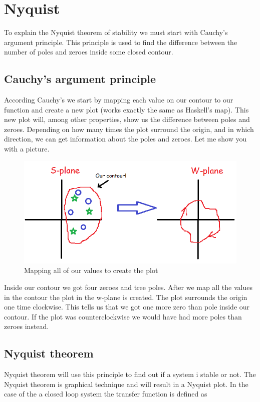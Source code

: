 \section{Nyquist}
To explain the Nyquist theorem of stability we must start with Cauchy's argument principle. This principle is used to find the difference between the number of poles and zeroes inside some closed contour.

\subsection{Cauchy's argument principle}
According Cauchy's we start by mapping each value on our contour to our function and create a new plot (works exactly the same as Haskell's map). This new plot will, among other properties, show us the difference between poles and zeroes. Depending on how many times the plot surround the origin, and in which direction, we can get information about the poles and zeroes. Let me show you with a picture.

\begin{figure}[h!]
    \centering
    \includegraphics[scale= 0.4]{Images/sw.PNG}
    \caption{Mapping all of our values to create the plot}
    \label{Cauchy}
\end{figure}

Inside our contour we got four zeroes and tree poles. After we map all the values in the contour the plot in the w-plane is created. The plot surrounds the origin one time clockwise. This tells us that we got one more zero than pole inside our contour. If the plot was counterclockwise we would have had more poles than zeroes instead.

\subsection{Nyquist theorem}
Nyquist theorem will use this principle to find out if a system i stable or not. The Nyquist theorem is graphical technique and will result in a Nyquist plot. In the case of the a closed loop system the transfer function is defined as

